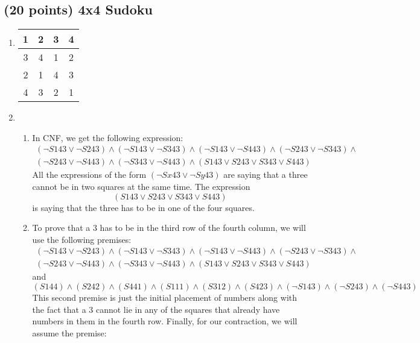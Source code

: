 \documentclass{article}
\begin{document}
	\subsection{(20 points) 4x4 Sudoku}
	\begin{enumerate}
		\item \begin{tabular}{|c|c|c|c|}
			\hline
			1 & 2 & 3 & 4 \\\hline
			3 & 4 & 1 & 2 \\\hline
			2 & 1 & 4 & 3 \\\hline
			4 & 3 & 2 & 1 \\\hline
		\end{tabular}
		\item 
		\leavevmode
		\begin{enumerate}
			\item In CNF, we get the following expression:
			\begin{multline*}
			(\neg S143 \lor \neg S243)\land (\neg S143 \lor \neg S343)\land (\neg S143 \lor \neg S443)\land (\neg S243 \lor \neg S343)\land \\ (\neg S243 \lor \neg S443)\land (\neg S343 \lor \neg S443)\land (S143 \lor S243 \lor S343 \lor S443) 
			\end{multline*}
			All the expressions of the form $(\neg Sx43 \lor \neg Sy43)$ are saying that a three cannot be in two squares at the same time. The expression
			\[ (S143 \lor S243 \lor S343 \lor S443) \]
			is saying that the three has to be in one of the four squares. 
			\item To prove that a 3 has to be in the third row of the fourth column, we will use the following premises:
			\begin{multline*}
			(\neg S143 \lor \neg S243)\land (\neg S143 \lor \neg S343)\land (\neg S143 \lor \neg S443)\land (\neg S243 \lor \neg S343)\land \\ (\neg S243 \lor \neg S443)\land (\neg S343 \lor \neg S443)\land (S143 \lor S243 \lor S343 \lor S443) 
			\end{multline*}
			and
			\begin{equation*}
			(S144)\land(S242)\land(S441)\land(S111)\land(S312)\land(S423)\land(\neg S143)\land(\neg S243)\land(\neg S443)
			\end{equation*}
			This second premise is just the initial placement of numbers along with the fact that a 3 cannot lie in any of the squares that already have numbers in them in the fourth row. Finally, for our contraction, we will assume the premise:
			\begin{equation*}

\end{equation*}
\end{enumerate}
\end{enumerate}
\end{document}
